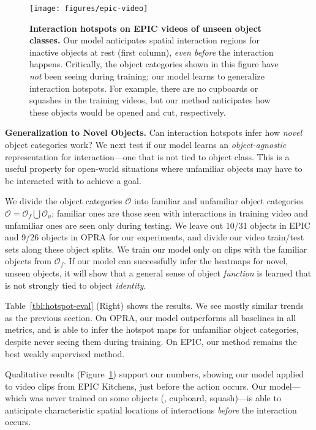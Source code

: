 \documentclass[10pt,twocolumn,letterpaper]{article}
\newcommand{\reffig}[1]{Figure~\ref{#1}}
\newcommand{\reftbl}[1]{Table~\ref{#1}}
\begin{document}
\begin{figure}
\centering
\texttt{[image: figures/epic-video]}
\vspace*{-0.25in}
\caption{\textbf{Interaction hotspots on EPIC videos of unseen object classes.} Our model anticipates spatial interaction regions for inactive objects at rest (first column), \emph{even before} the interaction happens. Critically, the object categories shown in this figure have \emph{not} been seeing during training; our model learns to generalize interaction hotspots.  For example, there are no cupboards or squashes in the training videos, but our method anticipates how these objects would be opened and cut, respectively. } \label{fig:epic-video}
\end{figure}

\vspace{0.05in}
\noindent\textbf{Generalization to Novel Objects.} Can interaction hotspots infer how \emph{novel} object categories work?  We next test if our model learns an \emph{object-agnostic} representation for interaction---one that is not tied to object class. This is a useful property for open-world situations where unfamiliar objects may have to be interacted with to achieve a goal. 

We divide the object categories $\mathcal{O}$ into familiar and unfamiliar object categories $\mathcal{O} = \mathcal{O}_f \bigcup \mathcal{O}_u$; familiar ones are those seen with interactions in training video and unfamiliar ones are seen only during testing. We leave out 10/31 objects in EPIC and 9/26 objects in OPRA for our experiments, and divide our video train/test sets along these object splits.  We train our model only on clips with the familiar objects from $\mathcal{O}_f$. If our model can successfully infer the heatmaps for novel, unseen objects, it will show that a general sense of object \emph{function} is learned that is not strongly tied to object \emph{identity}. 

\reftbl{tbl:hotspot-eval} (Right) shows the results. We see mostly similar trends as the previous section.  On OPRA, our model outperforms all baselines in all metrics, and is able to infer the hotspot maps for unfamiliar object categories, despite never seeing them during training. 
On EPIC, our method remains the best weakly supervised method.


Qualitative results (\reffig{fig:epic-video}) support our numbers, showing our model applied to video clips from EPIC Kitchens, just before the action occurs. Our model---which was never trained on some objects (\eg, cupboard, squash)---is able to anticipate characteristic spatial locations of interactions \emph{before} the interaction occurs. 
\end{document}
